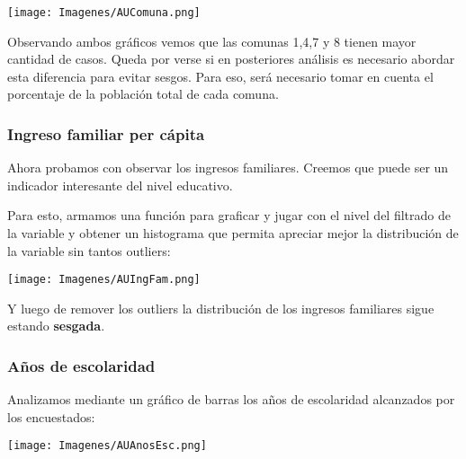 \documentclass[a4paper]{article}
\begin{document}
            \begin{center}
                \texttt{[image: Imagenes/AUComuna.png]}    
            \end{center}
 
            Observando ambos gráficos vemos que las comunas 1,4,7 y 8 tienen mayor cantidad de casos. Queda por verse si en posteriores análisis es necesario abordar esta diferencia para evitar sesgos. Para eso, será necesario tomar en cuenta el porcentaje de la población total de cada comuna.
           
            \subsubsection{Ingreso familiar per cápita}
           
            Ahora probamos con observar los ingresos familiares. Creemos que puede ser un indicador interesante del nivel educativo.
           
            Para esto, armamos una función para graficar y jugar con el nivel del filtrado de la variable y obtener un histograma que permita apreciar mejor la distribución de la variable sin tantos outliers:
           
            \begin{center}
                \texttt{[image: Imagenes/AUIngFam.png]}
            \end{center}
           
           
 
            Y luego de remover los outliers la distribución de los ingresos familiares sigue estando \textbf{sesgada}.

            \subsubsection{Años de escolaridad}
           
            Analizamos mediante un gráfico de barras los años de escolaridad alcanzados por los encuestados:
           
            \begin{center}
                \texttt{[image: Imagenes/AUAnosEsc.png]}
            \end{center}
           
\end{document}
